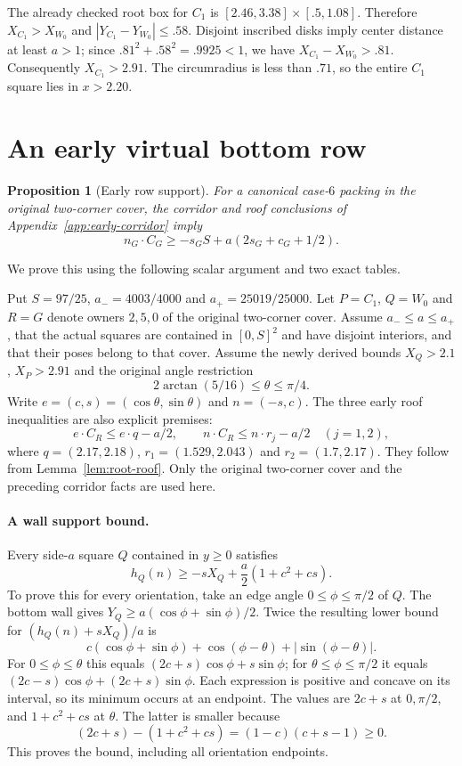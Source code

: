 \documentclass[11pt]{article}
\newtheorem{proposition}[theorem]{Proposition}
\begin{document}
The already checked root box for $C_1$ is
$[2.46,3.38]\times[.5,1.08]$. Therefore $X_{C_1}>X_{W_0}$ and
$|Y_{C_1}-Y_{W_0}|\le.58$.
Disjoint inscribed disks imply center distance at least $a>1$;
since $.81^2+.58^2=.9925<1$, we have
$X_{C_1}-X_{W_0}>.81$. Consequently $X_{C_1}>2.91$.
The circumradius is less than $.71$, so the entire $C_1$ square
lies in $x>2.20$.


\section{An early virtual bottom row}\label{app:early-bottom-row}
\begin{proposition}[Early row support]\label{lem:scalar-early-row}
For a canonical case-$6$ packing in the original two-corner cover, the
corridor and roof conclusions of Appendix~\ref{app:early-corridor} imply
\[
 n_G\cdot C_G\ge-s_GS+a(2s_G+c_G+1/2).
\]
\end{proposition}
We prove this using the following scalar argument and two exact tables.

Put $S=97/25$, $a_-=4003/4000$ and $a_+=25019/25000$.
Let $P=C_1$, $Q=W_0$ and $R=G$ denote owners $2,5,0$ of the
original two-corner cover. Assume $a_-\le a\le a_+$, that the actual
squares are contained in $[0,S]^2$ and have disjoint interiors, and that
their poses belong to that cover. Assume the newly derived bounds
$X_Q>2.1$, $X_P>2.91$ and the original angle restriction
\[
 2\arctan(5/16)\le\theta\le\pi/4.
\]
Write $e=(c,s)=(\cos\theta,\sin\theta)$ and $n=(-s,c)$.
The three early roof inequalities are also explicit premises:
\[
 e\cdot C_R\le e\cdot q-a/2,\qquad
 n\cdot C_R\le n\cdot r_j-a/2\quad(j=1,2),
\]
where $q=(2.17,2.18)$, $r_1=(1.529,2.043)$ and $r_2=(1.7,2.17)$.
They follow from Lemma~\ref{lem:root-roof}. Only the original two-corner
cover and the preceding corridor facts are used here.

\paragraph{A wall support bound.}
Every side-$a$ square $Q$ contained in $y\ge0$ satisfies
\begin{equation}\label{eq:scalar-early-row-wall-bootstrap}
 h_Q(n)\ge-sX_Q+\frac a2(1+c^2+cs).
\end{equation}
To prove this for every orientation, take an edge angle
$0\le\phi\le\pi/2$ of $Q$. The bottom wall gives
$Y_Q\ge a(\cos\phi+\sin\phi)/2$. Twice the resulting lower
bound for $(h_Q(n)+sX_Q)/a$ is
\[
 c(\cos\phi+\sin\phi)+\cos(\phi-\theta)
                         +|\sin(\phi-\theta)|.
\]
For $0\le\phi\le\theta$ this equals
$(2c+s)\cos\phi+s\sin\phi$; for
$\theta\le\phi\le\pi/2$ it equals
$(2c-s)\cos\phi+(2c+s)\sin\phi$.
Each expression is positive and concave on its interval, so its minimum
occurs at an endpoint. The values are $2c+s$ at $0,\pi/2$, and
$1+c^2+cs$ at $\theta$. The latter is smaller because
\[
 (2c+s)-(1+c^2+cs)=(1-c)(c+s-1)\ge0.
\]
This proves the bound, including all orientation endpoints.
\end{document}
